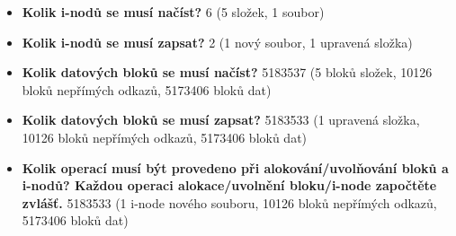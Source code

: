 \begin{itemize}
    \item \textbf{Kolik i-nodů se musí načíst?} 6 
    (5 složek, 1 soubor)
    \item \textbf{Kolik i-nodů se musí zapsat?} 2 
    (1 nový soubor, 1 upravená složka)
    \item \textbf{Kolik datových bloků se musí načíst?} 5183537
    (5 bloků složek, 10126 bloků nepřímých odkazů, 5173406 bloků dat)
    \item \textbf{Kolik datových bloků se musí zapsat?} 5183533
    (1 upravená složka, 10126 bloků nepřímých odkazů, 5173406 bloků dat)
    \item \textbf{Kolik operací musí být provedeno při alokování/uvolňování bloků a i-nodů? Každou operaci alokace/uvolnění bloku/i-node započtěte zvlášť.} 5183533
    (1 i-node nového souboru, 10126 bloků nepřímých odkazů, 5173406 bloků dat)
\end{itemize}
